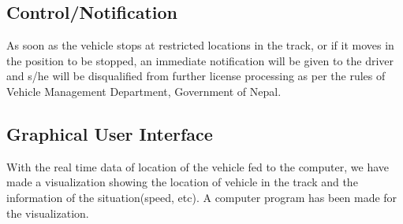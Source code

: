 
	\subsection{Control/Notification}
		As soon as the vehicle stops at restricted locations in the track, or if it moves in the position to be stopped, an immediate notification will be given to the driver and s/he will be disqualified from further license processing as per the rules of Vehicle Management Department, Government of Nepal.

	\subsection{Graphical User Interface}
		With the real time data of location of the vehicle fed to the computer, we have  made a visualization showing the location of vehicle in the track and the information of the situation(speed, etc). A computer program has been made for the visualization. 
